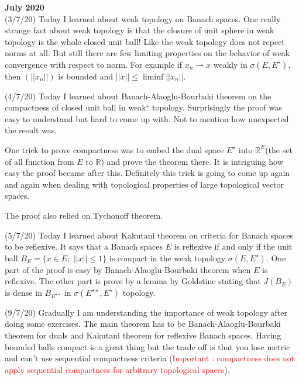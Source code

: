 \documentclass[12pt,a4paper]{article}
\begin{document}
\maketitle\textbf{July 2020}
\\

(3/7/20) Today I learned about weak topology on Banach spaces. One really strange fact about weak topology is that the closure of unit sphere in weak topology is the whole closed unit ball! Like the weak topology does not repect norms at all. But still there are few limiting properties on the behavior of weak convergence with respect to norm. For example if $x_n \rightharpoonup x$  weakly in $\sigma(E,E^{\star})$, then $(||x_n||)$ is bounded and $||x|| \le \liminf||x_n||$.


(4/7/20) Today I learned about Banach-Alaoglu-Bourbaki theorem on the compactness of closed unit ball in weak$^\star$ topology. Surprisingly the proof was easy to understand but hard to come up with. Not to mention how unexpected the result was.

One trick to prove compactness was to embed the dual space $E^{\star}$ into $\mathbb{R}^E$(the set of all function from $E$ to $\mathbb{R}$) and prove the theorem there. It is intriguing how easy the proof became after this. Definitely this trick is going to come up again and again when dealing with topological properties of large topological vector spaces.

The proof also relied on Tychonoff theorem.

(5/7/20) Today I learned about Kakutani theorem on criteria for Banach spaces to be reflexive. It says that a Banach spaces $E$ is reflexive if and only if the unit ball $B_E = \{x \in E ; \, \,||x|| \le 1 \}$ is compact in the weak topology $\sigma(E,E^{\star})$. One part of the proof is easy by Banach-Alaoglu-Bourbaki theorem when $E$ is reflexive. The other part is prove by a lemma by Goldstine stating that $J(B_E)$ is dense in $B_{E^{\star\star}}$ in $\sigma(E^{\star\star},E^{\star})$ topology.

(9/7/20) Gradually I am understanding the importance of weak topology after doing some exercises. The main theorem has to be Banach-Alaoglu-Bourbaki theorem for duals and Kakutani theorem for reflexive Banach spaces. Having bounded balls compact is a great thing but the trade off is that you lose metric and can't use sequential compactness criteria (\textcolor{red}{Important : compactness does not apply sequential compactness for arbitrary topological spaces}).
\end{document}
